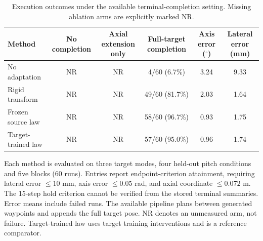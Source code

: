\begin{table}[t]
\centering
\caption{Execution outcomes under the available terminal-completion setting. Missing ablation arms are explicitly marked NR.}
\label{tab:mode_execution_ablation}
\small
\begin{tabular}{lccccc}
\toprule
Method & No completion & Axial extension only & Full-target completion & Axis error ($^\circ$) & Lateral error (mm) \\
\midrule
No adaptation & NR & NR & 4/60 (6.7\%) & 3.24 & 9.33 \\
Rigid transform & NR & NR & 49/60 (81.7\%) & 2.03 & 1.64 \\
Frozen source law & NR & NR & 58/60 (96.7\%) & 0.93 & 1.75 \\
Target-trained law & NR & NR & 57/60 (95.0\%) & 0.96 & 1.74 \\
\bottomrule
\end{tabular}
\par\smallskip
\begin{minipage}{0.98\textwidth}\footnotesize
Each method is evaluated on three target modes, four held-out pitch conditions and five blocks (60 runs). Entries report endpoint-criterion attainment, requiring lateral error $\leq10$ mm, axis error $\leq0.05$ rad, and axial coordinate $\leq0.072$ m. The 15-step hold criterion cannot be verified from the stored terminal summaries. Error means include failed runs. The available pipeline plans between generated waypoints and appends the full target pose. NR denotes an unmeasured arm, not failure. Target-trained law uses target training interventions and is a reference comparator.
\end{minipage}
\end{table}
